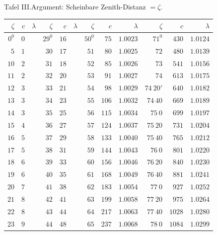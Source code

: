 %
\makebox[\dimexpr\linewidth-24mm\relax]{}%
\makebox[12mm][r]{}\par\nobreak\smallskip
\begin{GaussVIRefractionPlate}{Tafel III.\quad Argument: Scheinbare Zenith-Distanz $=\zeta$.}
{\fontsize{9}{11}\selectfont\setlength{\tabcolsep}{3pt}
\begin{tabular}{r|r|r||r|r|r||r|r|r||r|r|r}
$\zeta$&$c$&$\lambda$&$\zeta$&$c$&$\lambda$&$\zeta$&$c$&$\lambda$&$\zeta$&$c$&$\lambda$\\\hline
$0^0$ & $0$ &  & $29^0$ & $16$ &  & $50^0$ & $75$ & $1.0023$ & $71^0$ & $430$ & $1.0124$\\
$5$ & $1$ &  & $30$ & $17$ &  & $51$ & $80$ & $1.0025$ & $72$ & $480$ & $1.0139$\\
$10$ & $2$ &  & $31$ & $18$ &  & $52$ & $85$ & $1.0026$ & $73$ & $541$ & $1.0156$\\
$11$ & $2$ &  & $32$ & $20$ &  & $53$ & $91$ & $1.0027$ & $74$ & $613$ & $1.0175$\\
$12$ & $3$ &  & $33$ & $21$ &  & $54$ & $98$ & $1.0029$ & $74\ 20'$ & $640$ & $1.0182$\\
$13$ & $3$ &  & $34$ & $23$ &  & $55$ & $106$ & $1.0032$ & $74\ 40$ & $669$ & $1.0189$\\
$14$ & $3$ &  & $35$ & $25$ &  & $56$ & $115$ & $1.0034$ & $75\ 0$ & $699$ & $1.0197$\\
$15$ & $4$ &  & $36$ & $27$ &  & $57$ & $124$ & $1.0037$ & $75\ 20$ & $731$ & $1.0204$\\
$16$ & $5$ &  & $37$ & $29$ &  & $58$ & $133$ & $1.0040$ & $75\ 40$ & $765$ & $1.0212$\\
$17$ & $5$ &  & $38$ & $31$ &  & $59$ & $144$ & $1.0043$ & $76\ 0$ & $801$ & $1.0220$\\
$18$ & $6$ &  & $39$ & $33$ &  & $60$ & $156$ & $1.0046$ & $76\ 20$ & $840$ & $1.0230$\\
$19$ & $6$ &  & $40$ & $35$ &  & $61$ & $168$ & $1.0049$ & $76\ 40$ & $881$ & $1.0241$\\
$20$ & $7$ &  & $41$ & $38$ &  & $62$ & $183$ & $1.0054$ & $77\ 0$ & $927$ & $1.0252$\\
$21$ & $8$ &  & $42$ & $41$ &  & $63$ & $199$ & $1.0058$ & $77\ 20$ & $975$ & $1.0264$\\
$22$ & $8$ &  & $43$ & $44$ &  & $64$ & $217$ & $1.0063$ & $77\ 40$ & $1028$ & $1.0280$\\
$23$ & $9$ &  & $44$ & $48$ &  & $65$ & $237$ & $1.0068$ & $78\ 0$ & $1084$ & $1.0299$\\

\end{tabular}}
\end{GaussVIRefractionPlate}
